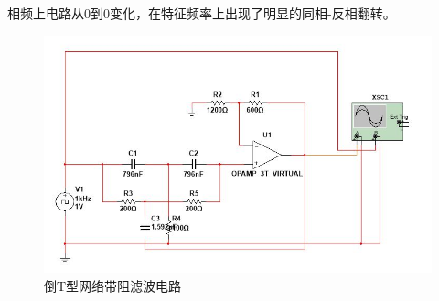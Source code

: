 \documentclass[UTF8,a4paper]{paper}
\begin{document}
相频上电路从0到0变化，在特征频率上出现了明显的同相-反相翻转。
\begin{figure}[h]
\centering
\includegraphics[width=\columnwidth]{S.jpg}
\caption{倒T型网络带阻滤波电路}
\label{P}
\end{figure}
\end{document}
